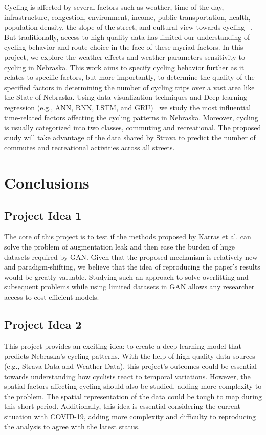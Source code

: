\documentclass{report}
\begin{document}
Cycling is affected by several factors such as weather, time of the day, infrastructure, congestion, environment, income, public transportation, health, population density, the slope of the street, and cultural view towards cycling ~\cite{musakwa2016mapping, roy2019correcting, hochmair2019estimating}. But traditionally, access to high-quality data has limited our understanding of cycling behavior and route choice in the face of these myriad factors. In this project, we explore the weather effects and weather parameters sensitivity to cycling in Nebraska. This work aims to specify cycling behavior further as it relates to specific factors, but more importantly, to determine the quality of the specified factors in determining the number of cycling trips over a vast area like the State of Nebraska. 
Using data visualization techniques and Deep learning regression (e.g., ANN, RNN, LSTM, and GRU)~\cite{hassoun1995fundamentals, graves2013generating} we study the most influential time-related factors affecting the cycling patterns in Nebraska. Moreover, cycling is usually categorized into two classes, commuting and recreational. The proposed study will take advantage of the data shared by Strava to predict the number of commutes and recreational activities across all streets. 

\section{Conclusions}
\subsection{Project Idea 1}
The core of this project is to test if the methods proposed by Karras et al. can solve the problem of augmentation leak and then ease the burden of huge datasets required by GAN. Given that the proposed mechanism is relatively new and paradigm-shifting, we believe that the idea of reproducing the paper's results would be greatly valuable. Studying such an approach to solve overfitting and subsequent problems while using limited datasets in GAN allows any researcher access to cost-efficient models.

\subsection{Project Idea 2}
This project provides an exciting idea: to create a deep learning model that predicts Nebraska's cycling patterns. With the help of high-quality data sources (e.g., Strava Data and Weather Data), this project's outcomes could be essential towards understanding how cyclists react to temporal variations. However, the spatial factors affecting cycling should also be studied, adding more complexity to the problem. The spatial representation of the data could be tough to map during this short period. Additionally, this idea is essential considering the current situation with COVID-19, adding more complexity and difficulty to reproducing the analysis to agree with the latest status.




\end{document}

